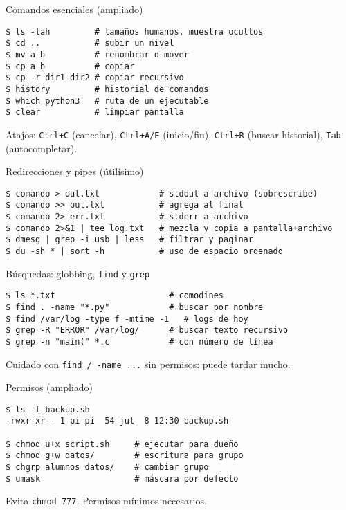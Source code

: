 \documentclass[aspectratio=169,professionalfonts]{beamer}
\begin{document}
\begin{frame}[fragile]{Comandos esenciales (ampliado)}
\begin{verbatim}
$ ls -lah         # tamaños humanos, muestra ocultos
$ cd ..           # subir un nivel
$ mv a b          # renombrar o mover
$ cp a b          # copiar
$ cp -r dir1 dir2 # copiar recursivo
$ history         # historial de comandos
$ which python3   # ruta de un ejecutable
$ clear           # limpiar pantalla
\end{verbatim}
\begin{infobox}
Atajos: \texttt{Ctrl+C} (cancelar), \texttt{Ctrl+A/E} (inicio/fin),
\texttt{Ctrl+R} (buscar historial), \texttt{Tab} (autocompletar).
\end{infobox}
\end{frame}

\begin{frame}[fragile]{Redirecciones y pipes (útilísimo)}
\begin{verbatim}
$ comando > out.txt            # stdout a archivo (sobrescribe)
$ comando >> out.txt           # agrega al final
$ comando 2> err.txt           # stderr a archivo
$ comando 2>&1 | tee log.txt   # mezcla y copia a pantalla+archivo
$ dmesg | grep -i usb | less   # filtrar y paginar
$ du -sh * | sort -h           # uso de espacio ordenado
\end{verbatim}
\end{frame}

\begin{frame}[fragile]{Búsquedas: globbing, \texttt{find} y \texttt{grep}}
\begin{verbatim}
$ ls *.txt                       # comodines
$ find . -name "*.py"            # buscar por nombre
$ find /var/log -type f -mtime -1   # logs de hoy
$ grep -R "ERROR" /var/log/      # buscar texto recursivo
$ grep -n "main(" *.c            # con número de línea
\end{verbatim}
\begin{warnbox}
Cuidado con \texttt{find / -name ...} sin permisos: puede tardar mucho.
\end{warnbox}
\end{frame}

\begin{frame}[fragile]{Permisos (ampliado)}
\begin{verbatim}
$ ls -l backup.sh
-rwxr-xr-- 1 pi pi  54 jul  8 12:30 backup.sh

$ chmod u+x script.sh     # ejecutar para dueño
$ chmod g+w datos/        # escritura para grupo
$ chgrp alumnos datos/    # cambiar grupo
$ umask                   # máscara por defecto
\end{verbatim}
\begin{warnbox}
Evita \texttt{chmod 777}. Permisos mínimos necesarios.
\end{warnbox}
\end{frame}
\end{document}
